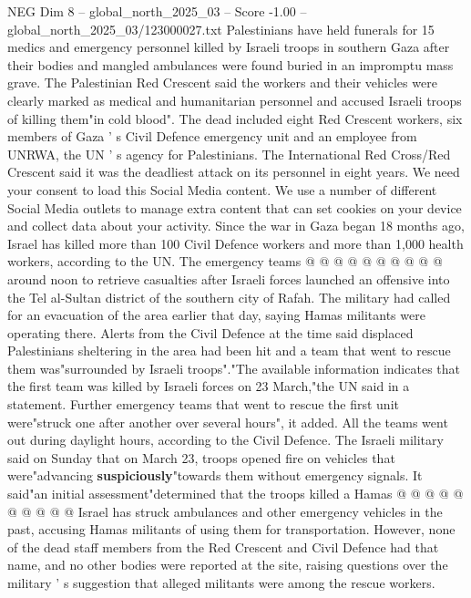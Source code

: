 \begin{textsample}{NEG Dim 8 – global\_north\_2025\_03 – Score -1.00 – global\_north\_2025\_03/123000027.txt}  \label{ex:f8_neg_124}
Palestinians have held funerals for 15 medics and emergency personnel killed by Israeli troops in southern Gaza after their bodies and mangled ambulances were found buried in an impromptu mass grave.
The Palestinian Red Crescent said the workers and their vehicles were clearly marked as medical and humanitarian personnel and accused Israeli troops of killing them"in cold blood".
The dead included eight Red Crescent workers, six members of Gaza ' s Civil Defence emergency unit and an employee from UNRWA, the UN ' s agency for Palestinians.
The International Red Cross/Red Crescent said it was the deadliest attack on its personnel in eight years.
We need your consent to load this Social Media content.
We use a number of different Social Media outlets to manage extra content that can set cookies on your device and collect data about your activity.
Since the war in Gaza began 18 months ago, Israel has killed more than 100 Civil Defence workers and more than 1,000 health workers, according to the UN.
The emergency teams @ @ @ @ @ @ @ @ @ @ around noon to retrieve casualties after Israeli forces launched an offensive into the Tel al-Sultan district of the southern city of Rafah.
The military had called for an evacuation of the area earlier that day, saying Hamas militants were operating there.
Alerts from the Civil Defence at the time said displaced Palestinians sheltering in the area had been hit and a team that went to rescue them was"surrounded by Israeli troops"."The available information indicates that the first team was killed by Israeli forces on 23 March,"the UN said in a statement.
Further emergency teams that went to rescue the first unit were"struck one after another over several hours", it added.
All the teams went out during daylight hours, according to the Civil Defence.
The Israeli military said on Sunday that on March 23, troops opened fire on vehicles that were"advancing \textbf{suspiciously}"towards them without emergency signals.
It said"an initial assessment"determined that the troops killed a Hamas @ @ @ @ @ @ @ @ @ @ Israel has struck ambulances and other emergency vehicles in the past, accusing Hamas militants of using them for transportation.
However, none of the dead staff members from the Red Crescent and Civil Defence had that name, and no other bodies were reported at the site, raising questions over the military ' s suggestion that alleged militants were among the rescue workers.

\end{textsample}
